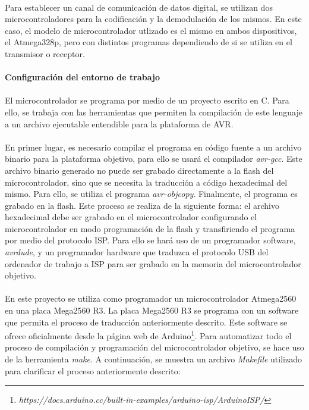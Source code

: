 \paragraph{}
Para establecer un canal de comunicación de datos digital, se utilizan dos microcontroladores para la codificación y la demodulación de los mismos. En este caso, el modelo de microcontrolador utlizado es el mismo en ambos dispositivos, el Atmega328p, pero con distintos programas dependiendo de si se utiliza en el transmisor o receptor.

\paragraph{Configuraci\'on del entorno de trabajo}
\paragraph{}
El microcontrolador se programa por medio de un proyecto escrito en C. Para ello, se trabaja con las herramientas que permiten la compilación de este lenguaje a un archivo ejecutable entendible para la plataforma de AVR.
\paragraph{}
En primer lugar, es necesario compilar el programa en c\'odigo fuente a un archivo binario para la plataforma objetivo, para ello se usar\'a el compilador \textit{avr-gcc}. Este archivo binario generado no puede ser grabado directamente a la flash del microcontrolador, sino que se necesita la traducción a código hexadecimal del mismo. Para ello, se utiliza el programa \textit{avr-objcopy}. 
Finalmente, el programa es grabado en la flash. Este proceso se realiza de la siguiente forma: el archivo hexadecimal debe ser grabado en el microcontrolador configurando el microcontrolador en modo programaci\'on de la flash y transfiriendo el programa por medio del protocolo ISP. 
Para ello se har\'a uso de un programador software, \textit{avrdude}, y un programador hardware que traduzca el protocolo USB del ordenador de trabajo a ISP para ser grabado en la memoria del microcontrolador objetivo. 
\paragraph{}
En este proyecto se utiliza como programador un microcontrolador Atmega2560 en una placa Mega2560 R3. 
La placa Mega2560 R3 se programa con un software que permita el proceso de traducción anteriormente descrito. Este software se ofrece oficialmente desde la p\'agina web de Arduino\footnote{\textit{https://docs.arduino.cc/built-in-examples/arduino-isp/ArduinoISP/}}.
Para automatizar todo el proceso de compilaci\'on y programaci\'on del microcontrolador objetivo, se hace uso de la herramienta \textit{make}. A continuaci\'on, se muestra un archivo \textit{Makefile} utilizado para clarificar el proceso anteriormente descrito:

